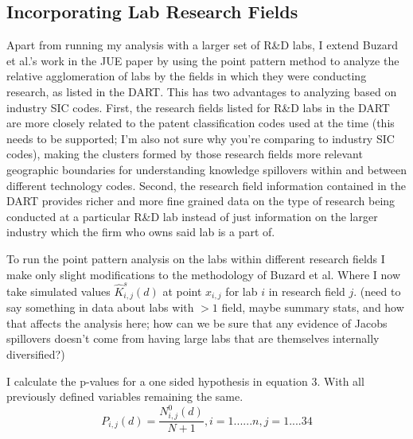 \documentclass[12pt,letterpaper]{article}
\begin{document}
\subsection{Incorporating Lab Research Fields}
Apart from running my analysis with a larger set of R\&D labs, I extend Buzard et al.'s work in the JUE paper by using the point pattern method to analyze the relative agglomeration of labs by the fields in which they were conducting research, as listed in the DART. This has two advantages to analyzing based on industry SIC codes. First, the research fields listed for R\&D labs in the DART are more closely related to the patent classification codes used at the time {\color{blue}(this needs to be supported; I'm also not sure why you're comparing to industry SIC codes)}, making the clusters formed by those research fields more relevant geographic boundaries for understanding knowledge spillovers within and between different technology codes. Second, the research field information contained in the DART provides richer and more fine grained data on the type of research being conducted at a particular R\&D lab instead of just information on the larger industry which the firm who owns said lab is a part of. 
\par 
To run the point pattern analysis on the labs within different research fields I make only slight modifications to the methodology of Buzard et al. Where I now take simulated values \(\hat{K}_{i,j}^s(d)\) at point \(x_{i,j}\) for lab \(i\) in research field \(j\). {\color{blue}(need to say something in data about labs with $>1$ field, maybe summary stats, and how that affects the analysis here; how can we be sure that any evidence of Jacobs spillovers doesn't come from having large labs that are themselves internally diversified?)}
\par 
I calculate the p-values for a one sided hypothesis in equation 3. With all previously defined variables remaining the same. 
\begin{equation}
    P_{i,j}(d) = \frac{N_{i,j}^0(d)}{N+1},i=1......n,j=1....34
\end{equation}
\end{document}
